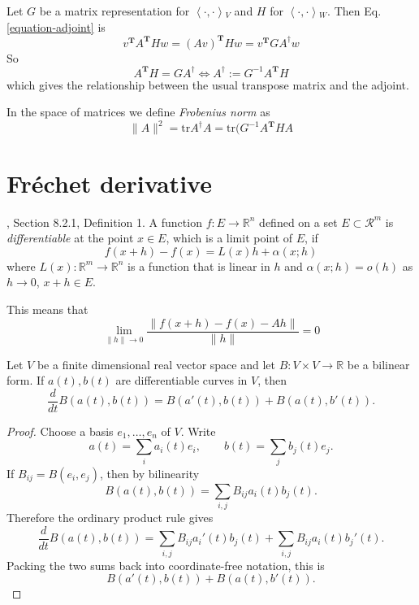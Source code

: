 Let $G$ be a matrix representation for
$\left\langle{}\cdot,\cdot\right\rangle{}_V$ and $H$ for
$\left\langle{}\cdot,\cdot\right\rangle{}_W$. Then Eq.
\ref{equation-adjoint} is
$$
v^{\mathbf{T}}A^{\mathbf{T}}Hw=(Av)
^{\mathbf{T}}Hw=v^{\mathbf{T}}GA^\dag
w
$$
So
\begin{equation}
\label{equation-adjoint-transpose}
A^{\mathbf{T}}H=GA^\dag \iff
A^\dag:=G^{-1}A^{\mathbf{T}}H
\end{equation}
which gives the relationship between the
usual transpose matrix and the adjoint.

\begin{definition}
\label{definition-Frobenius-norm}
In the space of matrices we define {\it
Frobenius norm} as
\begin{equation}
\label{equation-Frobenius-norm}
\|A\|^2=\text{tr}A^\dag
A=\text{tr}(G^{-1}A^{\mathbf{T}}HA
\end{equation}
\end{definition}

\section{Fréchet derivative}
\label{section-Fréchet-derivative}

\begin{definition}
\label{definition-Frechet-derivative}
\cite{zo1}, Section 8.2.1, Definition 1. A
function $f:E \to \mathbb{R}^n$
defined on a set $E \subset \mathcal{R}^m$ is
{\it differentiable} at the point
$x \in E$, which is a limit point of $E$, if
$$
f(x+h)-f(x)=L(x)h+\alpha(x;h)
$$
where $L(x):\mathbb{R}^m\to \mathbb{R}^n$ is
a function that is linear in $h$
and $\alpha(x;h)=o(h)$ as $h\to 0$, $x+h\in
E$.
\end{definition}

This means that
$$
\lim_{\|h\|\to 0}
\frac{\|f(x+h)-f(x)-Ah\|}{\|h\|}=0
$$
\begin{lemma}
\label{lemma-differentiating-bilinear-form}
Let $V$ be a finite dimensional real vector
space and let $B:V\times V\to \mathbb{R}$ be
a bilinear form. If $a(t),b(t)$ are
differentiable
curves in $V$, then
$$
\frac{d}{dt}B(a(t),b(t))
=
B(a'(t),b(t))+B(a(t),b'(t)).
$$
\end{lemma}

\begin{proof}
Choose a basis $e_1,\ldots,e_n$ of $V$. Write
$$
a(t)=\sum_i a_i(t)e_i,\qquad
b(t)=\sum_j b_j(t)e_j.
$$
If $B_{ij}=B(e_i,e_j)$, then by bilinearity
$$
B(a(t),b(t))=\sum_{i,j}B_{ij}a_i(t)b_j(t).
$$
Therefore the ordinary product rule gives
$$
\frac{d}{dt}B(a(t),b(t))
=
\sum_{i,j}B_{ij}a_i'(t)b_j(t)
+
\sum_{i,j}B_{ij}a_i(t)b_j'(t).
$$
Packing the two sums back into
coordinate-free notation, this is
$$
B(a'(t),b(t))+B(a(t),b'(t)).
$$
\end{proof}

